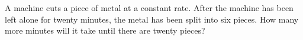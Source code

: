 A machine cuts a piece of metal at a constant rate. After the machine has been left alone for twenty minutes, the metal has been split into six pieces. How many more minutes will it take until there are twenty pieces?
